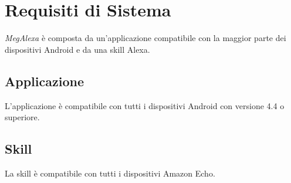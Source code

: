 \chapter{Requisiti di Sistema}
\label{RequisitSistema}
\textit{MegAlexa} è composta da un'applicazione compatibile con la maggior parte dei dispositivi Android e da una skill Alexa.
\section{Applicazione}
L'applicazione è compatibile con tutti i dispositivi Android con versione 4.4 o superiore.
\section{Skill}
La skill è compatibile con tutti i dispositivi Amazon Echo.
